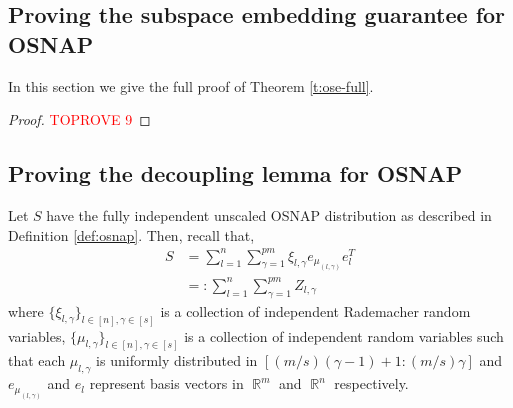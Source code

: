 \documentclass[11pt]{amsart}
\numberwithin{equation}{section}
\numberwithin{equation}{section}
\DeclareMathOperator{\R}{\mathbb{R}}
\DeclareMathOperator{\Pb}{\mathbb{P}}
\DeclarePairedDelimiter{\paren}{(}{)}
\theoremstyle{remark}
\theoremstyle{definition}
\begin{document}
\subsection{Proving the subspace embedding guarantee for OSNAP} \label{subsec:osnapfinal}
In this section we give the full proof of Theorem \ref{t:ose-full}.
\osnapmainthm*
\begin{comment}
\begin{theorem}[High Probability Bounds for the Embedding Error for OSNAP]\label{thm:osedecoup}
Let $S$ be an $m \times n$ matrix distributed according to the $8\lceil\log (d/\varepsilon\delta)\rceil$-wise independent unscaled OSNAP distribution with parameter $p$. Let $U$ be an arbitrary $n \times d$ deterministic matrix such that $U^TU=I$. Then, there exist positive constants $c_{\ref*{thm:osedecoup}.1}>0$ and
$c_{\ref*{thm:osedecoup}.2}>0$ such that for any $0 < \delta, \varepsilon < 1$ and $d>10$,
we have
\begin{equation}\label{osepro}
    \begin{aligned}
\Pb \left( 1 - \varepsilon  \leq s_{\min}((1/\sqrt{pm})SU)   \leq s_{\max}((1/\sqrt{pm})SU) \leq 1 + \varepsilon \right) \geq 1-\delta
\end{aligned}
\end{equation}
when $m \ge c_{\ref*{thm:osedecoup}.1}  \frac{d + \log(1/\delta\varepsilon)}{\varepsilon^2}  $ and
\begin{align*}pm \ge \min \left\{c_{\ref*{thm:osedecoup}.2} \paren*{\frac{(\log (d/\delta\varepsilon))^2}{\varepsilon}+(\log (d/\delta\varepsilon))^3},m \right\}
\end{align*}



\end{theorem}
\end{comment}


    \begin{proof}\textcolor{red}{TOPROVE 9}\end{proof}
\subsection{Proving the decoupling lemma for OSNAP} \label{subsec:decouposnap}
Let $S$ have the fully independent unscaled OSNAP distribution as described in Definition \ref{def:osnap}. Then, recall that,
\begin{align*}
    S &= \sum_{l=1}^n \sum_{\gamma=1}^{pm} \xi_{l,\gamma} e_{\mu_{(l, \gamma)}} e_l ^T \\
    &=: \sum_{l=1}^n \sum_{\gamma=1}^{pm} Z_{l,\gamma} 
\end{align*}
where $\{ \xi_{l,\gamma} \}_{l \in [n], \gamma \in [s]}$ is a collection of  independent Rademacher random variables, $\{ \mu_{l,\gamma} \}_{l \in [n], \gamma \in [s]}$ is a collection of independent random variables such that each $\mu_{l,\gamma}$ is uniformly distributed in $[(m/s)(\gamma-1)+1:(m/s)\gamma]$ and $e_{\mu_{(l, \gamma)}}$ and $e_l$ represent basis vectors in $\R^m$ and $\R^n$ respectively. 
\end{document}
